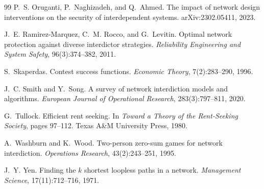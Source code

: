 \documentclass[10pt,a4paper,twoside]{article}
\theoremstyle{plain}
\theoremstyle{definition}
\begin{document}
\begin{thebibliography}{99}
P.~S. Oruganti, P.~Naghizadeh, and Q.~Ahmed.
\newblock The impact of network design interventions on the security of
  interdependent systems.
\newblock arXiv:2302.05411, 2023.

J.~E. Ramirez-Marquez, C.~M. Rocco, and G.~Levitin.
\newblock Optimal network protection against diverse interdictor strategies.
\newblock \emph{Reliability Engineering and System Safety}, 96(3):374--382,
  2011.

S.~Skaperdas.
\newblock Contest success functions.
\newblock \emph{Economic Theory}, 7(2):283--290, 1996.

J.~C. Smith and Y.~Song.
\newblock A survey of network interdiction models and algorithms.
\newblock \emph{European Journal of Operational Research}, 283(3):797--811,
  2020.

G.~Tullock.
\newblock Efficient rent seeking.
\newblock In \emph{Toward a Theory of the Rent-Seeking Society}, pages
  97--112. Texas A\&M University Press, 1980.

A.~Washburn and K.~Wood.
\newblock Two-person zero-sum games for network interdiction.
\newblock \emph{Operations Research}, 43(2):243--251, 1995.

J.~Y. Yen.
\newblock Finding the $k$ shortest loopless paths in a network.
\newblock \emph{Management Science}, 17(11):712--716, 1971.

\end{thebibliography}
\end{document}

